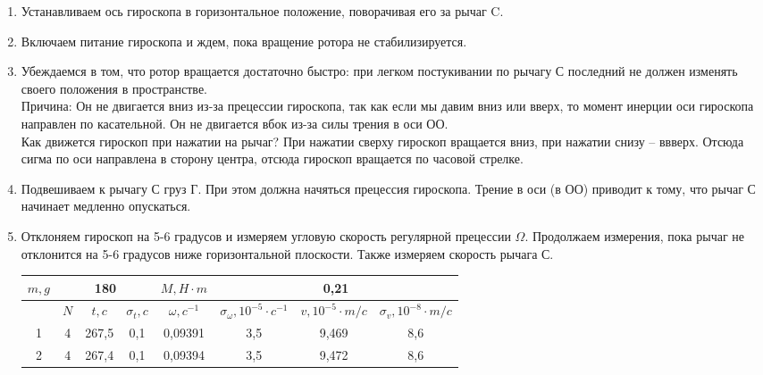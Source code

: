 \documentclass[a4paper, 12pt]{article}%
\begin{document}
\begin{enumerate}
\item Устанавливаем ось гироскопа в горизонтальное положение, поворачивая его за рычаг C. 
\item Включаем питание гироскопа и ждем, пока вращение ротора не стабилизируется. 
\item Убеждаемся в том, что ротор вращается достаточно быстро: при легком постукивании по рычагу С последний не должен изменять своего положения в пространстве. \\
Причина: Он не двигается вниз из-за прецессии гироскопа, так как если мы давим вниз или вверх, то момент инерции оси гироскопа направлен по касательной. Он не двигается вбок из-за силы трения в оси ОО. \\
Как движется гироскоп при нажатии на рычаг?
При нажатии сверху гироскоп вращается вниз, при нажатии снизу – ввверх. Отсюда сигма по оси направлена в сторону центра, отсюда гироскоп вращается по часовой стрелке.
\item Подвешиваем к рычагу С груз Г. При этом должна начяться прецессия гироскопа. Трение в оси (в ОО) приводит к тому, что рычаг С начинает медленно опускаться. 
\item Отклоняем гироскоп на 5-6 градусов и измеряем угловую скорость регулярной прецессии $\Omega$. Продолжаем измерения, пока рычаг не отклонится на 5-6 градусов ниже горизонтальной плоскости. Также измеряем скорость рычага С.
\begin{center}
\begin{tabular}{|c|c|c|c|c|c|c|c|}
\hline
\multicolumn{1}{|c|}{$m, g$} & \multicolumn{3}{c|}{180}                          & $M, H \cdot m$   & \multicolumn{3}{c|}{0,21}                                                                        \\ \hline
                             & $N$ & $t, c$                      & $\sigma_t, c$ & $\omega, c^{-1}$ & $\sigma_{\omega}, 10^{-5} \cdot c^{-1}$ & $v, 10^{-5} \cdot m/c$ & $\sigma_v, 10^{-8} \cdot m/c$ \\ \hline
1                            & 4   & 267,5                       &0,1&0,09391          & 3,5                                     & 9,469                  & 8,6                           \\ \hline
2                            & 4   & 267,4                       & 0,1           & 0,09394          & 3,5                                     & 9,472                  & 8,6                           \\ \hline

\end{tabular}
\end{center}
\end{enumerate}
\end{document}
